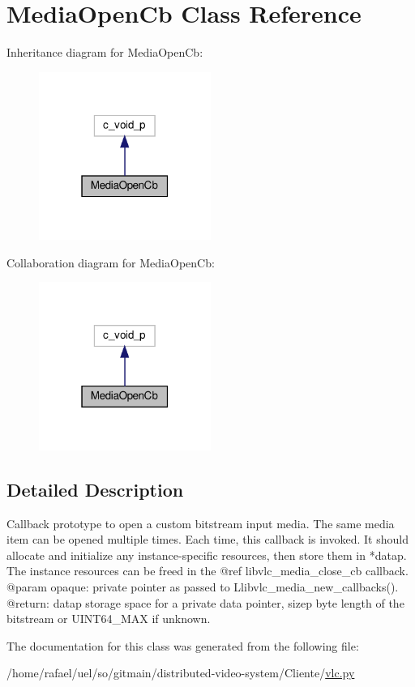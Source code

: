 \hypertarget{classvlc_1_1_media_open_cb}{}\section{Media\+Open\+Cb Class Reference}
\label{classvlc_1_1_media_open_cb}


Inheritance diagram for Media\+Open\+Cb\+:
\nopagebreak
\begin{figure}[H]
\begin{center}
\leavevmode
\includegraphics[width=159pt]{classvlc_1_1_media_open_cb__inherit__graph}
\end{center}
\end{figure}


Collaboration diagram for Media\+Open\+Cb\+:
\nopagebreak
\begin{figure}[H]
\begin{center}
\leavevmode
\includegraphics[width=159pt]{classvlc_1_1_media_open_cb__coll__graph}
\end{center}
\end{figure}


\subsection{Detailed Description}
\begin{DoxyVerb}Callback prototype to open a custom bitstream input media.
The same media item can be opened multiple times. Each time, this callback
is invoked. It should allocate and initialize any instance-specific
resources, then store them in *datap. The instance resources can be freed
in the @ref libvlc_media_close_cb callback.
@param opaque: private pointer as passed to L{libvlc_media_new_callbacks}().
@return: datap storage space for a private data pointer, sizep byte length of the bitstream or UINT64_MAX if unknown.
\end{DoxyVerb}
 

The documentation for this class was generated from the following file\+:\begin{DoxyCompactItemize}
\item 
/home/rafael/uel/so/gitmain/distributed-\/video-\/system/\+Cliente/\hyperlink{vlc_8py}{vlc.\+py}\end{DoxyCompactItemize}
